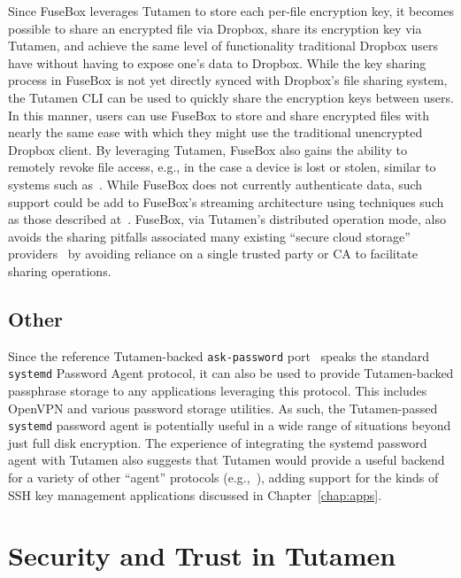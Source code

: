 Since FuseBox leverages Tutamen to store each per-file encryption key,
it becomes possible to share an encrypted file via Dropbox, share its
encryption key via Tutamen, and achieve the same level of
functionality traditional Dropbox users have without having to expose
one's data to Dropbox. While the key sharing process in FuseBox is not
yet directly synced with Dropbox's file sharing system, the Tutamen
CLI can be used to quickly share the encryption keys between users. In
this manner, users can use FuseBox to store and share encrypted files
with nearly the same ease with which they might use the traditional
unencrypted Dropbox client. By leveraging Tutamen, FuseBox also gains
the ability to remotely revoke file access, e.g., in the case a device
is lost or stolen, similar to systems such
as~\cite{geambasu2011}. While FuseBox does not currently authenticate
data, such support could be add to FuseBox's streaming architecture
using techniques such as those described
at~\cite{McGrew2005}. FuseBox, via Tutamen's distributed operation
mode, also avoids the sharing pitfalls associated many existing
``secure cloud storage'' providers~\cite{wilson2014} by avoiding
reliance on a single trusted party or CA to facilitate sharing
operations.

\subsection{Other}

Since the reference Tutamen-backed \texttt{ask-password}
port~\cite{src-tutamen-askpassword} speaks the standard
\texttt{systemd} Password Agent protocol, it can also be used to
provide Tutamen-backed passphrase storage to any applications
leveraging this protocol. This includes OpenVPN and various password
storage utilities. As such, the Tutamen-passed \texttt{systemd}
password agent is potentially useful in a wide range of situations
beyond just full disk encryption. The experience of integrating the
systemd password agent with Tutamen also suggests that Tutamen would
provide a useful backend for a variety of other ``agent'' protocols
(e.g.,~\cite{cox2002, ylonen1996}), adding support for the kinds of
SSH key management applications discussed in Chapter~\ref{chap:apps}.

\section{Security and Trust in Tutamen}
\label{chap:tutamen:trust}


